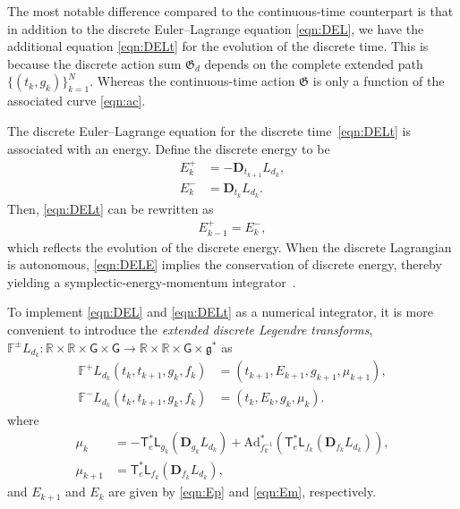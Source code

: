 \documentclass[letterpaper, 10pt, conference]{ieeeconf}
\newcommand{\G}{\ensuremath{\mathsf{G}}}
\newcommand{\T}{\ensuremath{\mathsf{T}}}
\renewcommand{\L}{\ensuremath{\mathsf{L}}}
\renewcommand{\Re}{\ensuremath{\mathbb{R}}}
\newcommand{\D}{\ensuremath{\mathbf{D}}}
\newcommand{\Ad}{\ensuremath{\mathrm{Ad}}}
\newcommand{\g}{\ensuremath{\mathfrak{g}}}
\begin{document}
The most notable difference compared to the continuous-time counterpart is that in addition to the discrete Euler--Lagrange equation \eqref{eqn:DEL}, we have the additional equation \eqref{eqn:DELt} for the evolution of the discrete time. 
This is because the discrete action sum $\mathfrak{G}_d$ depends on the complete extended path $\{(t_k,g_k)\}_{k=1}^N$.
Whereas the continuous-time action $\mathfrak{G}$ is only a function of the associated curve \eqref{eqn:ac}.

The discrete Euler--Lagrange equation for the discrete time~\eqref{eqn:DELt} is associated with an energy.
Define the discrete energy to be
\begin{align}
    E^+_k &= - \D_{t_{k+1}} L_{d_k},\label{eqn:Ep}\\
    E^-_k &= \D_{t_{k}} L_{d_k}.\label{eqn:Em}
\end{align}
Then, \eqref{eqn:DELt} can be rewritten as
\begin{align}
    E^+_{k-1} = E^-_k,\label{eqn:DELE}
\end{align}
which reflects the evolution of the discrete energy. 
When the discrete Lagrangian is autonomous, \eqref{eqn:DELE} implies the conservation of discrete energy, thereby yielding a symplectic-energy-momentum integrator~\cite{KaMaOr1999}.


To implement \eqref{eqn:DEL} and \eqref{eqn:DELt} as a numerical integrator, it is more convenient to introduce the \textit{extended discrete Legendre transforms}, $\mathbb{F}^\pm L_{d_k}: \Re\times\Re \times \G \times \G \rightarrow \Re\times \Re\times\G\times\g^*$ as
\begin{align}
    \mathbb{F}^+ L_{d_k} (t_k,t_{k+1}, g_k,f_k) & = (t_{k+1}, E_{k+1}, g_{k+1}, \mu_{k+1}),\\
    \mathbb{F}^- L_{d_k} (t_k,t_{k+1}, g_k,f_k) & = (t_k, E_k, g_{k}, \mu_{k}).
\end{align}
where
\begin{align}
    \mu_k & = -\T^*_e\L_{g_k}(\D_{g_k} L_{d_k})+ \Ad^*_{f_k^{-1}} (\T^*_e\L_{f_k}(\D_{f_k} L_{d_k})),\label{eqn:muk}\\
    \mu_{k+1} & = \T^*_e\L_{f_k} (\D_{f_k} L_{d_k}),\label{eqn:mukp}
\end{align}
and $E_{k+1}$ and $E_k$ are given by \eqref{eqn:Ep} and \eqref{eqn:Em}, respectively. 
\end{document}
